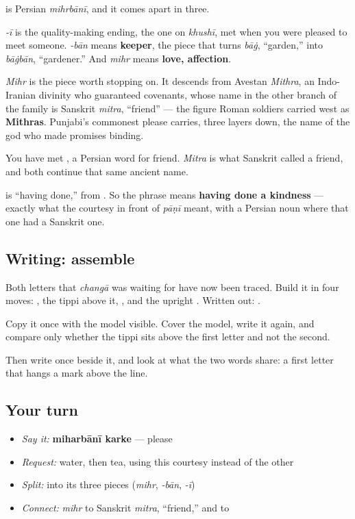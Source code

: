 \begin{cousinweb}
\textbf{} is Persian \emph{mihrbānī}, and it comes apart in three.

\emph{-ī} is the quality-making ending, the one on \emph{khushī}, met when you were pleased to meet someone. \emph{-bān} means \textbf{keeper}, the piece that turns \emph{bāġ}, \textquotedblleft{}garden,\textquotedblright{} into \emph{bāġbān}, \textquotedblleft{}gardener.\textquotedblright{} And \emph{mihr} means \textbf{love, affection}.

\emph{Mihr} is the piece worth stopping on. It descends from Avestan \emph{Mithra}, an Indo-Iranian divinity who guaranteed covenants, whose name in the other branch of the family is Sanskrit \emph{mitra}, \textquotedblleft{}friend\textquotedblright{} — the figure Roman soldiers carried west as \textbf{Mithras}. Punjabi's commonest please carries, three layers down, the name of the god who made promises binding.

You have met \textbf{}, a Persian word for friend. \emph{Mitra} is what Sanskrit called a friend, and both continue that same ancient name.

\textbf{} is \textquotedblleft{}having done,\textquotedblright{} from \textbf{}. So the phrase means \textbf{having done a kindness} — exactly what the courtesy in front of \emph{pāṇī} meant, with a Persian noun where that one had a Sanskrit one.
\end{cousinweb}

\subsection*{Writing: assemble }
Both letters that \emph{changā} was waiting for have now been traced. Build it in four moves: \textbf{}, the tippi \textbf{} above it, \textbf{}, and the upright \textbf{}. Written out: \textbf{}.

Copy it once with the model visible. Cover the model, write it again, and compare only whether the tippi sits above the first letter and not the second.

Then write \textbf{} once beside it, and look at what the two words share: a first letter that hangs a mark above the line.

\subsection*{Your turn}
\begin{itemize}
\raggedright
  \item \emph{Say it:} \textbf{miharbānī karke} — please
  \item \emph{Request:} water, then tea, using this courtesy instead of the other
  \item \emph{Split:} \textbf{} into its three pieces (\emph{mihr}, \emph{-bān}, \emph{-ī})
  \item \emph{Connect:} \emph{mihr} to Sanskrit \emph{mitra}, \textquotedblleft{}friend,\textquotedblright{} and to \textbf{}
\end{itemize}

